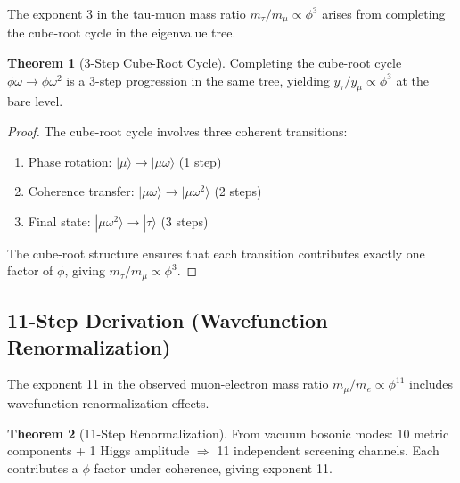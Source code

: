 \documentclass[11pt]{article}
\theoremstyle{definition}
\newtheorem{theorem}{Theorem}[section]
\newcommand{\goldenratio}{\phi}
\begin{document}
The exponent 3 in the tau-muon mass ratio $m_\tau/m_\mu \propto \goldenratio^3$ arises from completing the cube-root cycle in the eigenvalue tree.

\begin{theorem}[3-Step Cube-Root Cycle]
Completing the cube-root cycle $\goldenratio\omega \to \goldenratio\omega^2$ is a 3-step progression in the same tree, yielding $y_\tau/y_\mu \propto \goldenratio^3$ at the bare level.
\end{theorem}

\begin{proof}
The cube-root cycle involves three coherent transitions:
\begin{enumerate}
\item Phase rotation: $|\mu\rangle \to |\mu\omega\rangle$ (1 step)
\item Coherence transfer: $|\mu\omega\rangle \to |\mu\omega^2\rangle$ (2 steps)
\item Final state: $|\mu\omega^2\rangle \to |\tau\rangle$ (3 steps)
\end{enumerate}

The cube-root structure ensures that each transition contributes exactly one factor of $\goldenratio$, giving $m_\tau/m_\mu \propto \goldenratio^3$.
\end{proof}

\subsection{11-Step Derivation (Wavefunction Renormalization)}

The exponent 11 in the observed muon-electron mass ratio $m_\mu/m_e \propto \goldenratio^{11}$ includes wavefunction renormalization effects.

\begin{theorem}[11-Step Renormalization]
From vacuum bosonic modes: 10 metric components + 1 Higgs amplitude $\Rightarrow$ 11 independent screening channels. Each contributes a $\goldenratio$ factor under coherence, giving exponent 11.
\end{theorem}
\end{document}
